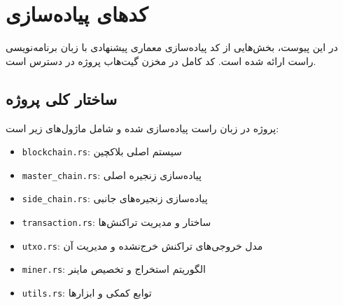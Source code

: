     
\let\Chapter\chapter

\chapter{کدهای پیاده‌سازی}

در این پیوست، بخش‌هایی از کد پیاده‌سازی معماری پیشنهادی با زبان برنامه‌نویسی راست ارائه شده است. کد کامل در مخزن گیت‌هاب پروژه در دسترس است.

\section{ساختار کلی پروژه}

پروژه در زبان راست پیاده‌سازی شده و شامل ماژول‌های زیر است:

\begin{itemize}
    \item \texttt{blockchain.rs}: سیستم اصلی بلاکچین
    \item \texttt{master\_chain.rs}: پیاده‌سازی زنجیره اصلی
    \item \texttt{side\_chain.rs}: پیاده‌سازی زنجیره‌های جانبی
    \item \texttt{transaction.rs}: ساختار و مدیریت تراکنش‌ها
    \item \texttt{utxo.rs}: مدل خروجی‌های تراکنش خرج‌نشده و مدیریت آن
    \item \texttt{miner.rs}: الگوریتم استخراج و تخصیص ماینر
    \item \texttt{utils.rs}: توابع کمکی و ابزارها
\end{itemize}

